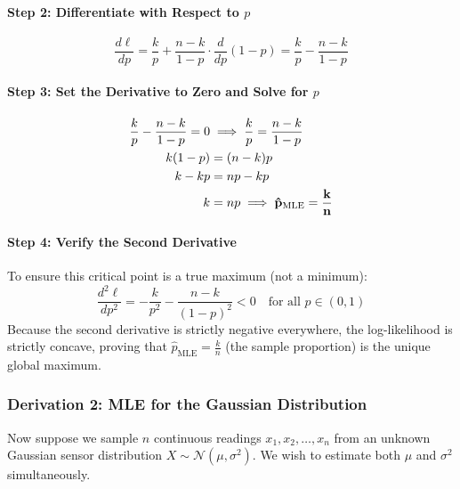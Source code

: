 \paragraph{Step 2: Differentiate with Respect to $p$}
\begin{equation}
\frac{d\ell}{dp} = \frac{k}{p} + \frac{n - k}{1 - p} \cdot \frac{d}{dp}(1 - p) = \frac{k}{p} - \frac{n - k}{1 - p}
\end{equation}

\paragraph{Step 3: Set the Derivative to Zero and Solve for $p$}
\begin{align}
\frac{k}{p} - \frac{n - k}{1 - p} = 0 &\implies \frac{k}{p} = \frac{n - k}{1 - p} \notag\\
k(1 - p) &= (n - k)p \notag\\
k - kp &= np - kp \notag\\
k &= np \implies \mathbf{\hat{p}_{\text{MLE}} = \frac{k}{n}}\label{eq:bernoulli_mle_result}
\end{align}

\paragraph{Step 4: Verify the Second Derivative}
To ensure this critical point is a true maximum (not a minimum):
\begin{equation}
\frac{d^2\ell}{dp^2} = -\frac{k}{p^2} - \frac{n - k}{(1 - p)^2} < 0 \quad \text{for all } p \in (0, 1)
\end{equation}
Because the second derivative is strictly negative everywhere, the log-likelihood is strictly concave, proving that $\hat{p}_{\text{MLE}} = \frac{k}{n}$ (the sample proportion) is the unique global maximum.

\subsubsection{Derivation 2: MLE for the Gaussian Distribution}
Now suppose we sample $n$ continuous readings $x_1, x_2, \dots, x_n$ from an unknown Gaussian sensor distribution $X \sim \mathcal{N}(\mu, \sigma^2)$. We wish to estimate both $\mu$ and $\sigma^2$ simultaneously.

